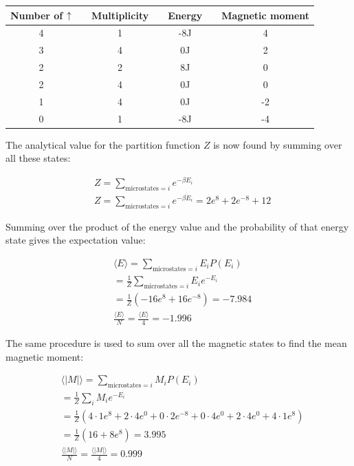 \begin{center}
\label{tab:states-2x2-summary}
\begin{tabularx}{\textwidth}{|c| X c| X c| X c|}
    \hline 
    \hline 
        Number of $\color{black}{\uparrow}$ && Multiplicity && Energy && Magnetic moment \\ 
    \hline
        4   &&      1      &&      -8J     &&       4       \\  
        3   &&      4      &&      0J      &&       2       \\
        2   &&      2      &&      8J      &&       0       \\
        2   &&      4      &&      0J      &&       0       \\
        1   &&      4      &&      0J      &&       -2      \\
        0   &&      1      &&      -8J     &&       -4      \\
    \hline
\end{tabularx}
\end{center}


The analytical value for the partition function $Z$ is now found by summing over all these states:

\begin{align*}
    &Z = \sum_{\text{microstates}=i} e^{-\beta E_i}\\
    &Z = \sum_{\text{microstates}=i}e^{-\beta E_i}=2e^{8}+2e^{-8}+12
\end{align*}

Summing over the product of the energy value and the probability of that energy state gives the expectation value:


\begin{align*}
    &\langle E \rangle = \sum_{\text{microstates}=i} E_iP(E_i)\\
    &=\frac{1}{Z} \sum_{\text{microstates}=i} E_i e^{-E_i}\\
    &=\frac{1}{Z} \left( -16 e^8 + 16e^{-8} \right) = -7.984\\ 
    &\frac{\langle E \rangle }{N}= \frac{\langle E \rangle}{4} = -1.996
\end{align*}


The same procedure is used to sum over all the magnetic states to find the mean magnetic moment:

\begin{align*}
    &\langle |M| \rangle = \sum_{\text{microstates}=i} M_iP(E_i)\\
    &= \frac{1}{Z} \sum_i M_i e^{-E_i}\\
    &= \frac{1}{Z}\left(4\cdot1e^{8}+2\cdot4e^{0}+ 0\cdot2e^{-8}+0\cdot4e^{0}+2\cdot4e^{0}+4\cdot1e^{8}\right)\\
    &=\frac{1}{Z}\left(16+8e^{8}\right) = 3.995\\
    &\frac{\langle |M| \rangle }{N}= \frac{\langle |M| \rangle}{4} = 0.999
\end{align*}


